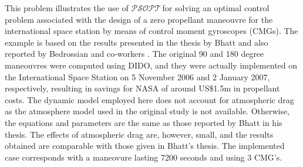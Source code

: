 \documentclass[a4paper,11pt]{report}    %
\newcommand{\psopt}{$\mathcal{PSOPT}$\,}  %
\begin{document}
This problem illustrates the use of \psopt for solving an optimal control problem associated with the
design of a zero propellant maneouvre for the international space station by means of control moment gyroscopes (CMGs). 
The example is based on the results presented in the thesis by Bhatt \cite{Bhatt:07} and also reported by Bedrossian and co-workers \cite{Bedrossian:09}. 
The original 90 and 180 degree maneouvres were computed using DIDO, and  they were actually implemented on the International Space Station on 5 November
2006 and 2 January 2007, respectively, resulting in savings for NASA of around US\$1.5m in propellant costs. The dynamic model employed here does not account for atmospheric drag
as the atmosphere model used in the original study is not available.  
Otherwise, the equations and parameters are the same  as those reported by Bhatt in his thesis. 
The effects of atmospheric drag are, however, small, and the results obtained are comparable with those given
in Bhatt's thesis. The implemented case corresponds with a maneovure lasting 7200 seconds and using 3 CMG's.
\end{document}
